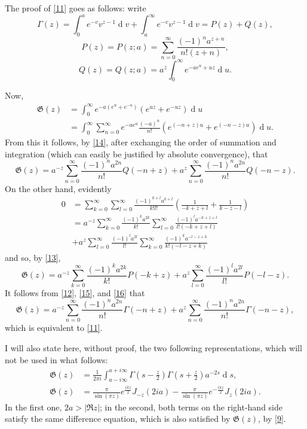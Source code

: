 \documentclass{article}
\newcommand{\dd}{\operatorname{d}\!}
\newcommand{\GG}{\mathfrak{G}}
\newcommand{\oldpage}[1]{\marginpar{\phantom{.}\\\footnotesize$\Big\vert$ \textit{p.~#1}}}
\begin{document}
The proof of \cref{11} goes as follows: write
\[
\label{12}
  \Gamma(z)
  = \int_0^a e^{-v} v^{z-1} \dd v + \int_a^\infty e^{-v} v^{z-1} \dd v
  = P(z) + Q(z),
\tag{12}
\]
\[
\label{13}
  P(z) = P(z;a) = \sum_{n=0}^\infty \frac{(-1)^n a^{z+n}}{n!(z+n)},
\tag{13}
\]
\[
\label{14}
  Q(z) = Q(z;a) = a^z \int_0^\infty e^{-ae^u+uz} \dd u.
\tag{14}
\]

Now,
\[
  \begin{aligned}
    \GG(z)
    &= \int_0^\infty e^{-a(e^u+e^{-u})} (e^{uz}+e^{-uz}) \dd u
  \\&= \int_0^\infty \sum_{n=0}^\infty e^{-ae^u} \frac{(-a)^n}{n!} (e^{(-n+z)u}+e^{(-n-z)u}) \dd u.
  \end{aligned}
\]
From this it follows, by \cref{14}, after exchanging the order of summation and integration (which can easily be justified by absolute convergence), that
\oldpage{308}
\[
\label{15}
  \GG(z)
  = a^{-z}\sum_{n=0}^\infty \frac{(-1)^n a^{2n}}{n!} Q(-n+z)
  + a^z\sum_{n=0}^\infty \frac{(-1)^n a^{2n}}{n!} Q(-n-z).
\tag{15}
\]
On the other hand, evidently
\[
  \begin{aligned}
    0
    &= \sum_{k=0}^\infty \sum_{l=0}^\infty \frac{(-1)^{k+l}a^{k+l}}{k!l!} \left(
      \frac{1}{-k+z+l} + \frac{1}{k-z-l}
    \right)
  \\&= a^{-z} \sum_{k=0}^\infty \frac{(-1)^ka^{2k}}{k!} \sum_{l=0}^\infty \frac{(-1)^la^{-k+z+l}}{l!(-k+z+l)}
  \\&+ a^z \sum_{l=0}^\infty \frac{(-1)^la^{2l}}{l!} \sum_{k=0}^\infty \frac{(-1)^ka^{-l-z+k}}{k!(-l-z+k)}
  \end{aligned}
\]
and so, by \cref{13},
\[
\label{16}
  \GG(z)
  = a^{-z} \sum_{k=0}^\infty \frac{(-1)^ka^{2k}}{k!} P(-k+z)
  + a^z \sum_{l=0}^\infty \frac{(-1)^la^{2l}}{l!} P(-l-z).
\tag{16}
\]
It follows from \cref{12}, \cref{15}, and \cref{16} that
\[
  \GG(z)
  = a^{-z} \sum_{n=0}^\infty \frac{(-1)^na^{2n}}{n!} \Gamma(-n+z)
  + a^z \sum_{n=0}^\infty \frac{(-1)^na^{2n}}{n!} \Gamma(-n-z),
\]
which is equivalent to \cref{11}.

I will also state here, without proof, the two following representations, which will not be used in what follows:
\[
  \begin{aligned}
    \GG(z)
    &= \frac{1}{2\pi i} \int_{a-i\infty}^{a+i\infty} \Gamma\left(
      s - \frac{z}{2}
    \right) \Gamma \left(
      s + \frac{z}{2}
    \right) a^{-2s} \dd s,
  \\\GG(z)
    &= \frac{\pi}{\sin(\pi z)} e^{\frac{i\pi z}{2}} J_{-z}(2ia) - \frac{\pi}{\sin(\pi z)} e^{-\frac{i\pi z}{2}} J_z(2ia).
  \end{aligned}
\]
In the first one, $2a>|\Re z|$; in the second, both terms on the right-hand side satisfy the same difference equation, which is also satisfied by $\GG(z)$, by \cref{9}.
\end{document}
